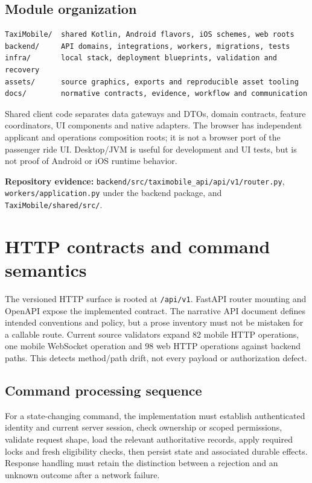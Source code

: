 \documentclass[11pt,a4paper]{article}
\newcommand{\src}[1]{{\small\nolinkurl{#1}}}
\newcommand{\evidence}[1]{\par\textbf{Repository evidence:} #1\par}
\begin{document}
\subsection{Module organization}
\begin{lstlisting}
TaxiMobile/  shared Kotlin, Android flavors, iOS schemes, web roots
backend/     API domains, integrations, workers, migrations, tests
infra/       local stack, deployment blueprints, validation and recovery
assets/      source graphics, exports and reproducible asset tooling
docs/        normative contracts, evidence, workflow and communication
\end{lstlisting}
Shared client code separates data gateways and DTOs, domain contracts, feature
coordinators, UI components and native adapters. The browser has independent
applicant and operations composition roots; it is not a browser port of the
passenger ride UI. Desktop/JVM is useful for development and UI tests, but is not
proof of Android or iOS runtime behavior.
\evidence{\src{backend/src/taximobile_api/api/v1/router.py}, \src{workers/application.py} under the backend package, and \src{TaxiMobile/shared/src/}.}

\section{HTTP contracts and command semantics}
The versioned HTTP surface is rooted at \src{/api/v1}. FastAPI router mounting and
OpenAPI expose the implemented contract. The narrative API document defines
intended conventions and policy, but a prose inventory must not be mistaken for
a callable route. Current source validators expand 82 mobile HTTP operations,
one mobile WebSocket operation and 98 web HTTP operations against backend paths.
This detects method/path drift, not every payload or authorization defect.

\subsection{Command processing sequence}
For a state-changing command, the implementation must establish authenticated
identity and current server session, check ownership or scoped permissions,
validate request shape, load the relevant authoritative records, apply required
locks and fresh eligibility checks, then persist state and associated durable
effects. Response handling must retain the distinction between a rejection and
an unknown outcome after a network failure.
\end{document}

